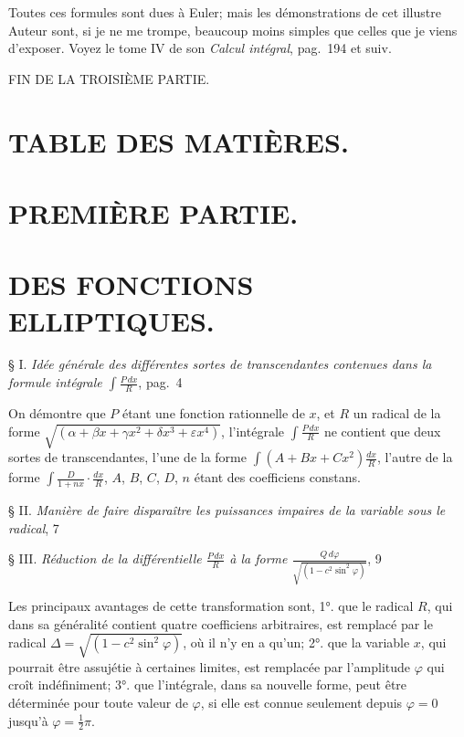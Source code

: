 \documentclass{article}
\begin{document}
Toutes ces formules sont dues à Euler; mais les démonstrations de cet illustre Auteur sont, si je ne me trompe, beaucoup moins simples que celles que je viens d'exposer. Voyez le tome IV de son \emph{Calcul intégral}, pag.~194 et suiv.

FIN DE LA TROISIÈME PARTIE.


\section*{TABLE DES MATIÈRES.}

\section*{PREMIÈRE PARTIE.}

\section*{DES FONCTIONS ELLIPTIQUES.}

§ I. \emph{Idée générale des différentes sortes de transcendantes contenues dans la formule intégrale $\displaystyle\int\frac{P\,dx}{R}$}, pag.~4

On démontre que $P$ étant une fonction rationnelle de $x$, et $R$ un radical de la forme $\sqrt{(\alpha+\beta x+\gamma x^{2}+\delta x^{3}+\varepsilon x^{4})}$, l'intégrale $\displaystyle\int\frac{P\,dx}{R}$ ne contient que deux sortes de transcendantes, l'une de la forme $\displaystyle\int(A+Bx+Cx^{2})\frac{dx}{R}$, l'autre de la forme $\displaystyle\int\frac{D}{1+nx}\cdot\frac{dx}{R}$, $A$, $B$, $C$, $D$, $n$ étant des coefficiens constans.

§ II. \emph{Manière de faire disparaître les puissances impaires de la variable sous le radical}, 7

§ III. \emph{Réduction de la différentielle $\frac{P\,dx}{R}$ à la forme $\frac{Q\,d\varphi}{\sqrt{(1-c^{2}\sin^{2}\varphi)}}$}, 9

Les principaux avantages de cette transformation sont, 1°. que le radical $R$, qui dans sa généralité contient quatre coefficiens arbitraires, est remplacé par le radical $\Delta=\sqrt{(1-c^{2}\sin^{2}\varphi)}$, où il n'y en a qu'un; 2°. que la variable $x$, qui pourrait être assujétie à certaines limites, est remplacée par l'amplitude $\varphi$ qui croît indéfiniment; 3°. que l'intégrale, dans sa nouvelle forme, peut être déterminée pour toute valeur de $\varphi$, si elle est connue seulement depuis $\varphi=0$ jusqu'à $\varphi=\frac{1}{2}\pi$.
\end{document}
